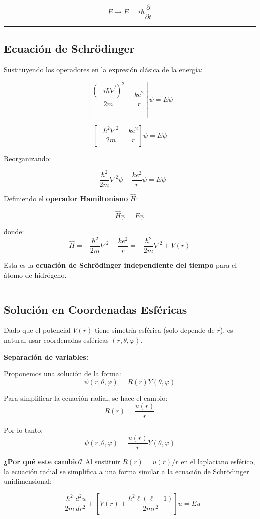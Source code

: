 \documentclass[a4paper]{article}
\begin{document}
\[
E \longrightarrow \hat{E} = i\hbar\frac{\partial}{\partial t}
\]

\bigskip\hrule\bigskip

\subsection{Ecuación de Schrödinger}

Sustituyendo los operadores en la expresión clásica de la energía:

\[
\left[\frac{(-i\hbar\vec{\nabla})^2}{2m} - \frac{ke^2}{r}\right]\psi = E\psi
\]

\[
\left[-\frac{\hbar^2\nabla^2}{2m} - \frac{ke^2}{r}\right]\psi = E\psi
\]

Reorganizando:

\[
-\frac{\hbar^2}{2m}\nabla^2\psi - \frac{ke^2}{r}\psi = E\psi
\]

Definiendo el \textbf{operador Hamiltoniano} $\hat{H}$:

\[
\hat{H}\psi = E\psi
\]

donde:
\[
\hat{H} = -\frac{\hbar^2}{2m}\nabla^2 - \frac{ke^2}{r} = -\frac{\hbar^2}{2m}\nabla^2 + V(r)
\]

Esta es la \textbf{ecuación de Schrödinger independiente del tiempo} para el átomo de hidrógeno.

\bigskip\hrule\bigskip

\subsection{Solución en Coordenadas Esféricas}

Dado que el potencial $V(r)$ tiene simetría esférica (solo depende de $r$), es natural usar coordenadas esféricas $(r, \theta, \varphi)$.

\textbf{Separación de variables:}

Proponemos una solución de la forma:
\[
\psi(r, \theta, \varphi) = R(r)Y(\theta, \varphi)
\]

Para simplificar la ecuación radial, se hace el cambio:
\[
R(r) = \frac{u(r)}{r}
\]

Por lo tanto:
\[
\psi(r, \theta, \varphi) = \frac{u(r)}{r}Y(\theta, \varphi)
\]

\textbf{¿Por qué este cambio?} Al sustituir $R(r) = u(r)/r$ en el laplaciano esférico, la ecuación radial se simplifica a una forma similar a la ecuación de Schrödinger unidimensional:

\[
-\frac{\hbar^2}{2m}\frac{d^2u}{dr^2} + \left[V(r) + \frac{\hbar^2\ell(\ell+1)}{2mr^2}\right]u = Eu
\]
\end{document}
